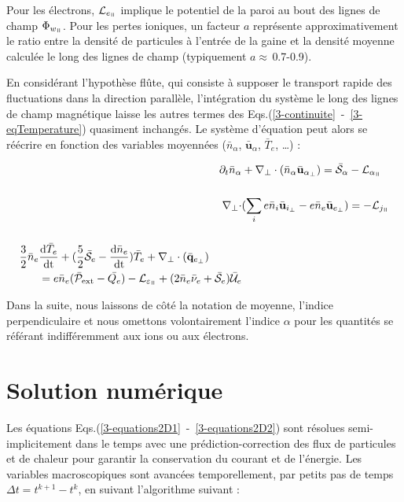 \begin{refsection}
Pour les électrons, $\mathcal{L}_{e_\para}$ implique le potentiel de la
paroi au bout des lignes de champ $\Phi_{w_\para}$. Pour les pertes ioniques, un
facteur $a$ représente approximativement le ratio entre la densité de particules à l'entrée
de la gaine et la densité moyenne calculée le long des lignes de champ
(typiquement $a\approx\,$0.7-0.9).

En considérant l'hypothèse flûte, qui
consiste à supposer le transport rapide des fluctuations dans la direction
parallèle, l'intégration du système le long des lignes de champ magnétique
laisse les autres termes des
Eqs.(\ref{3-continuite}~-~\ref{3-eqTemperature}) quasiment inchangés.
Le système d'équation peut alors se réécrire en fonction des variables moyennées
($\bar{n}_\alpha$, $\bar{\mathbf u}_\alpha$, $\bar{T}_e$, \ldots) :

\begin{align}
\label{3-equations2D1}
\partial_t \bar{n}_\alpha& +
\nabla_\perp\cdot\left(\bar{n}_\alpha\bar{\mathbf{u}}_{\alpha_\perp}\right)=\bar{\mathcal{S}}_\alpha
- \mathcal{L}_{\alpha_\para}\\[0.5cm]
\nabla_\perp\cdot&(\sum_ie\bar{n}_i\bar{\mathbf{u}}_{i_\perp}
-e\bar{n}_e\bar{\mathbf{u}}_{e_\perp})= - \mathcal{L}_{j_\para}\\[0.5cm]
\begin{split}\frac{3}{2}\bar{n}_e&\frac{\text{d}\bar{T}_e}{\text{dt}} +
(\frac{5}{2}\bar{\mathcal{S}}_e
-\frac{\text{d}\bar{n}_e}{\text{dt}})\bar{T}_e+\nabla_\perp\cdot(\bar{\mathbf{q}}_{e_\perp})\\
&=e\bar{n}_e(\bar{\mathcal{P}}_\text{ext}-\bar{Q_e})-\mathcal{L}_{\varepsilon_\para}
+(2\bar{n}_e\bar{\nu}_e+\bar{\mathcal{S}}_e)\bar{\mathcal{U}}_e
\label{3-equations2D2}
\end{split}
\end{align}

Dans la suite, nous laissons de côté la notation de moyenne, l'indice
perpendiculaire et nous omettons volontairement l'indice $\alpha$ pour les
quantités se référant indifféremment aux ions ou aux électrons.

\section{Solution numérique}

Les équations Eqs.(\ref{3-equations2D1}~-~\ref{3-equations2D2}) sont résolues
semi-implicitement dans le temps avec une prédiction-correction des flux de
particules et de chaleur pour garantir la conservation du courant et de
l'énergie. Les variables macroscopiques sont avancées temporellement, par
petits pas de temps $\Delta t=t^{k+1}-t^k$, en suivant l'algorithme suivant :


\end{refsection}
